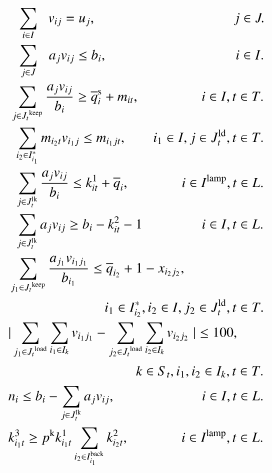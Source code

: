 \documentclass[a4j,11pt,twocolumn]{jsarticle}
\begin{document}
\begin{align}
&\hspace{0.6em} \sum_{i \in I} {\hspace{0.6em}v_{ij}} = u_j, \hspace{9.85em} j \in J. \\
&\hspace{0.6em} \sum_{j \in J} {\hspace{0.65em}a_{j}}{v_{ij}} \leq {b_{i}}, \hspace{9.2em} i \in I. \\
&\hspace{0.1em} \sum_{j \in {J_t}^{\rm{keep}}} \frac{a_{j} v_{ij}} {b_{i}} \geq \overline{q}_{i}^{\rm{s}} + {m_{it}}, \hspace{4.45em} i \in I, t \in T. \\
&\hspace{0.4em} \sum_{i_2 \in {I_{i_1}^*}} {m_{i_2t} v_{i_1j}} \leq {m_{i_1jt}}, \hspace{1.9em} i_1 \in I, j \in J_{t}^{\rm{ld}}, t \in T. \\
&\hspace{0.45em} \sum_{j \in J_{t}^{\rm{lk}}} \frac{a_{j} v_{ij}} {b_{i}} \leq k^1_{it} + \overline{q}_{i}, \hspace{3.75em} i \in I^{\rm{lamp}}, t \in L. \\
&\hspace{0.45em} \sum_{j \in J_{t}^{\rm{lk}}} a_{j} v_{ij}  \geq b_i - k^2_{it} - 1 \hspace{4.26em} i \in I, t \in L. \\
&\sum_{j_1\in {J_t}^{\rm{keep}}} \frac{a_{j_1} v_{i_1j_1}} {b_{i_1}} \leq \overline{q}_{i_2} + 1 - {x_{i_2j_2}}, \notag \\
&\hspace{6.9em} i_1 \in {I_{i_2}^*}, i_2 \in I, j_2 \in J_{t}^{\rm{ld}}, t \in T. \\
&| \sum_{j_1 \in {J_t}^{\rm{load}}} \sum_{i_1\in {I_k}} v_{i_1j_1} - \sum_{j_2 \in {J_t}^{\rm{load}}} \sum_{i_2\in {I_k}} v_{i_2j_2} \hspace{0.3em} | \leq 100, \notag \\
&\hspace{9.15em} k \in S_t, i_1, i_2 \in I_k, t \in T. \\
&n_{i} \leq b_{i} - \sum_{j \in J_{t}^{\rm{lk}}} a_j v_{ij}, \hspace{6.2em} i \in I, t \in L. \\
&k^3_{i_1t} \geq p^{\rm{k}} k^1_{i_1t} \sum_{i_2 \in I_{i_1}^{\rm{back}}} k^2_{i_2t}, \hspace{3.75em} i \in I^{\rm{lamp}}, t \in L.
\end{align}
\end{document}
